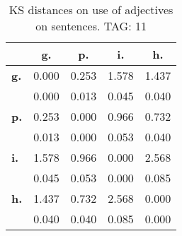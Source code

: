 \begin{table}[h!]
\begin{center}
\begin{tabular}{| l || c | c | c | c |}\hline
 & {\bf g.} & {\bf p.} & {\bf i.} & {\bf h.} \\\hline\hline
{\bf g.} & 0.000 & 0.253 & 1.578 & 1.437 \\
{\bf } & 0.000 & 0.013 & 0.045 & 0.040 \\\hline
{\bf p.} & 0.253 & 0.000 & 0.966 & 0.732 \\
{\bf } & 0.013 & 0.000 & 0.053 & 0.040 \\\hline
{\bf i.} & 1.578 & 0.966 & 0.000 & 2.568 \\
{\bf } & 0.045 & 0.053 & 0.000 & 0.085 \\\hline
{\bf h.} & 1.437 & 0.732 & 2.568 & 0.000 \\
{\bf } & 0.040 & 0.040 & 0.085 & 0.000 \\\hline
\end{tabular}
\caption{KS distances on use of adjectives on sentences. TAG: 11}
\end{center}
\end{table}